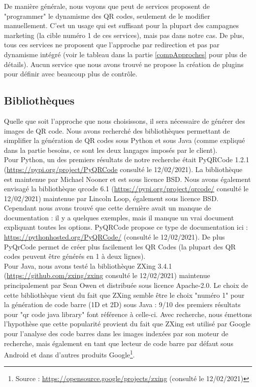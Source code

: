 \documentclass[a4paper,12pt]{article}
\begin{document}
De manière générale, nous voyons que peut de services proposent de "programmer" le dynamisme des QR codes, seulement de le modifier manuellement. C'est un usage qui est suffisant pour la plupart des campagnes marketing (la cible numéro 1 de ces services), mais pas dans notre cas. De plus, tous ces services ne proposent que l'approche par redirection et pas par dynamisme intégré (voir le tableau dans la partie \ref{compApproches} pour plus de détails). Aucun service que nous avons trouvé ne propose la création de plugins pour définir avec beaucoup plus de contrôle.

\subsection{Bibliothèques}

Quelle que soit l’approche que nous choisissons, il sera nécessaire de générer des images de QR code. Nous avons recherché des bibliothèques permettant de simplifier la génération de QR codes sous Python et sous Java (comme expliqué dans la partie besoins, ce sont les deux langages imposés par le client).\\
Pour Python, un des premiers résultats de notre recherche était PyQRCode 1.2.1 (\url{https://pypi.org/project/PyQRCode} consulté le 12/02/2021). La bibliothèque est maintenue par Michael Nooner et est sous licence BSD. Nous avons également envisagé la bibliothèque qrcode 6.1 (\url{https://pypi.org/project/qrcode/} consulté le 12/02/2021) maintenue par Lincoln Loop, également sous licence BSD. Cependant nous avons trouvé que cette dernière avait un manque de documentation : il y a quelques exemples, mais il manque un vrai document expliquant toutes les options. PyQRCode propose ce type de documentation ici : \url{https://pythonhosted.org/PyQRCode/} (consulté le 12/02/2021). De plus PyQrCode permet de créer plus facilement les QR Codes (la plupart des QR codes peuvent être générés en 1 à deux lignes).\\

Pour Java, nous avons testé la bibliothèque ZXing 3.4.1 (\url{https://github.com/zxing/zxing} consulté le 12/02/2021) maintenue principalement par Sean Owen et distribuée sous licence Apache-2.0. Le choix de cette bibliothèque vient du fait que ZXing semble être le choix "numéro 1" pour la génération de code barre (1D et 2D) sous Java : 9/10 des premiers résultats pour "qr code java library" font référence à celle-ci. Avec recherche, nous émettons l'hypothèse que cette popularité provient du fait que ZXing est utilisé par Google pour l'analyse des code barres dans les images indexées par son moteur de recherche, mais également en tant que lecteur de code barre par défaut sous Android et dans d'autres produits Google\footnote{Source : \url{https://opensource.google/projects/zxing} (consulté le 12/02/2021)}.
\end{document}

